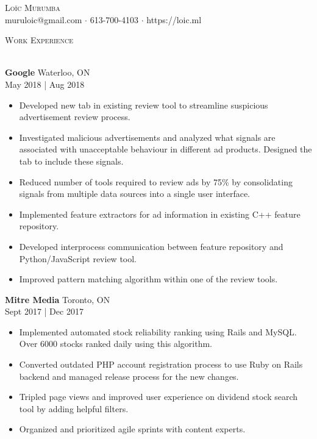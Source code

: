\documentclass[a4paper]{article}
\newcommand{\lineunder} {
    \vspace*{-8pt} \\
    \hspace*{-18pt} \hrulefill \\
}
\newcommand{\header} [1] {
    {\hspace*{-18pt}\vspace*{6pt} \textsc{#1}}
    \vspace*{-6pt} \lineunder
}
\begin{document}
\vspace*{-40pt}

    

\vspace*{-10pt}
\begin{center}
	{\Huge \scshape {Loïc Murumba}}\\
	muruloic@gmail.com $\cdot$ 613-700-4103 $\cdot$ https://loic.ml\\
\end{center}

\header{Work Experience}
\vspace{1mm}

\textbf{Google} \hfill Waterloo, ON\\
 \hfill May 2018 | Aug 2018\\
\vspace{-1mm}
\begin{itemize} \itemsep 1pt
	\item Developed new tab in existing review tool to streamline suspicious advertisement review process.
    \item Investigated malicious advertisements and analyzed what signals are associated with unacceptable behaviour in different ad products. Designed the tab to include these signals.
    \item Reduced number of tools required to review ads by 75\% by consolidating signals from multiple data sources into a single user interface.
	\item Implemented feature extractors for ad information in existing C++ feature repository.
	\item Developed interprocess communication between feature repository and Python/JavaScript review tool.
	\item Improved pattern matching algorithm within one of the review tools.
\end{itemize}

\textbf{Mitre Media} \hfill Toronto, ON\\
 \hfill Sept 2017 | Dec 2017\\
\vspace{-1mm}
\begin{itemize} \itemsep 1pt
	\item Implemented automated stock reliability ranking using Rails and MySQL. Over 6000 stocks ranked daily using this algorithm.
	\item Converted outdated PHP account registration process to use Ruby on Rails backend and managed release process for the new changes.
	\item Tripled page views and improved user experience on dividend stock search tool by adding helpful filters.
	\item Organized and prioritized agile sprints with content experts.
\end{itemize}
\end{document}

